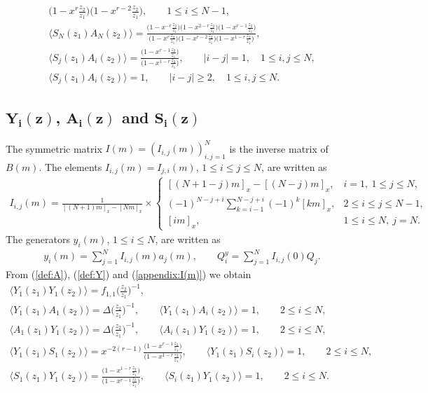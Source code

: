 \documentclass[10pt,a4paper]{amsart}
\numberwithin{equation}{section}
\begin{document}
\begin{gather}
{\big(1-x^{r}\frac{z_2}{z_1}\big)\big(1-x^{r-2}\frac{z_2}{z_1}\big)},\qquad
1\leq i \leq N-1,\nonumber
\\
\langle S_N(z_1)A_N(z_2)\rangle=\frac{
\big(1-x^{-r}\frac{z_2}{z_1}\big)\big(1-x^{2-r}\frac{z_2}{z_1}\big)
\big(1-x^{r-1}\frac{z_2}{z_1}\big)}{
\big(1-x^{r}\frac{z_2}{z_1}\big)\big(1-x^{r-2}\frac{z_2}{z_1}\big)
\big(1-x^{1-r}\frac{z_2}{z_1}\big)},\nonumber
\\
\langle S_j(z_1)A_i(z_2)\rangle=\frac{\big(1-x^{r-1}\frac{z_2}{z_1}\big)}{
\big(1-x^{1-r}\frac{z_2}{z_1}\big)},\qquad |i-j|=1,\quad 1\leq i,j \leq N,\nonumber
\\
\langle S_j(z_1)A_i(z_2)\rangle=1,\qquad |i-j|\geq 2,\quad 1\leq i,j \leq N.
\label{appendix:SA}
\end{gather}

\subsection[\protect{$Y\_\{i\}(z)$}, \protect{$A\_\{i\}(z)$} and \protect{$S\_\{i\}(z)$}]
{$\boldsymbol{Y_i(z)}$, $\boldsymbol{A_i(z)}$ and $\boldsymbol{S_i(z)}$}
The symmetric matrix $I(m)=(I_{i,j}(m))_{i,j=1}^N$ is the inverse matrix of $B(m)$.
The elements $I_{i,j}(m)=I_{j,i}(m)$, $1\leq i \leq j \leq N$, are written as
\begin{gather*}
I_{i, j}(m)=\frac{1}{[(N\!+\!1)m]_x-[Nm]_x}
\times \begin{cases}
[(N+1-j)m]_x-[(N-j)m]_x, &i=1,\ 1\leq j \leq N,
\\[1ex]
(-1)^{N-j+i}\displaystyle\sum_{k=i-1}^{N-j+i}(-1)^k [km]_x,
&2\leq i \leq j \leq N-1,
\\[1ex]
[i m]_x,&1\leq i \leq N,\ j=N.
\end{cases}
\label{appendix:I(m)}
\end{gather*}
The generators $y_i(m)$, $1\leq i \leq N$, are written as
\begin{gather}
y_i(m)=\sum_{j=1}^N I_{i,j}(m)a_j(m),\qquad
Q_i^y=\sum_{j=1}^N I_{i,j}(0)Q_j.
\label{eqn:y(m)}
\end{gather}
From (\ref{def:A}), (\ref{def:Y}) and (\ref{appendix:I(m)}) we obtain
\begin{gather}
\langle Y_1(z_1)Y_1(z_2)\rangle=f_{1,1}\bigg(\frac{z_2}{z_1}\bigg)^{-1},\nonumber
\\
\langle Y_1(z_1)A_1(z_2)\rangle =\Delta\bigg(\frac{z_2}{z_1}\bigg)^{-1},\qquad
\langle Y_1(z_1)A_i(z_2)\rangle=1,\qquad 2\leq i \leq N,\nonumber
\\
\langle A_1(z_1)Y_1(z_2)\rangle=\Delta\bigg(\frac{z_2}{z_1}\bigg)^{-1},\qquad
\langle A_i(z_1)Y_1(z_2)\rangle=1,\qquad 2\leq i \leq N,\nonumber
\\
\langle Y_1(z_1)S_1(z_2)\rangle =x^{-2(r-1)}\frac{\big(1-x^{r-1}\frac{z_2}{z_1}\big)}{\big(1-x^{1-r}\frac{z_2}{z_1}\big)},\qquad
\langle Y_1(z_1)S_i(z_2)\rangle=1,\qquad 2\leq i \leq N,
\nonumber
\\
\langle S_1(z_1)Y_1(z_2)\rangle
=\frac{\big(1-x^{1-r}\frac{z_2}{z_1}\big)}{\big(1-x^{r-1}\frac{z_2}{z_1}\big)},\qquad
\langle S_i(z_1)Y_1(z_2)\rangle =1,\qquad 2\leq i \leq N.
\label{appendix:Y}
\end{gather}
\end{document}
